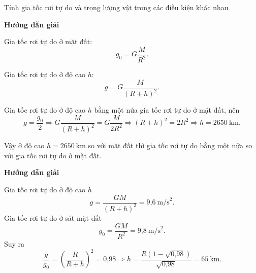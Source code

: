 \begin{dang}{Tính gia tốc rơi tự do và  trọng lượng vật trong các điều kiện khác nhau}
	{	\begin{center}
			\textbf{Hướng dẫn giải}
		\end{center}
		
		Gia tốc rơi tự do ở mặt đất:
		$$g_0 = G \dfrac {M}{R^2}.$$
		
		Gia tốc rơi tự do ở độ cao $h$:
		$$g=G \dfrac {M}{(R+h)^2}.$$
		
		Gia tốc rơi tự do ở độ cao $h$ bằng một nửa gia tốc rơi tự do ở mặt đất, nên
		$$g=\dfrac{g_0}{2} \Rightarrow G \dfrac {M}{(R+h)^2} = G \dfrac {M}{2R^2} \Rightarrow (R+h)^2 = 2 R^2 \Rightarrow h=\SI{2650}{\kilo \meter}.$$
		
		Vậy ở độ cao $h=\SI{2650}{\kilo \meter}$ so với mặt đất thì gia tốc rơi tự do bằng một nửa so với gia tốc rơi tự do ở mặt đất.
		
	}
	{	\begin{center}
			\textbf{Hướng dẫn giải}
		\end{center}
		
		Gia tốc rơi tự do ở độ cao $h$ 
		\begin{equation*}
			g = \dfrac{GM}{(R+h)^2} = \text{9,6}\ \text{m/s}^2.
		\end{equation*}
		Gia tốc rơi tự do ở sát mặt đất 
		\begin{equation*}
			g_0 = \dfrac{GM}{R^2} = \text{9,8}\ \text{m/s}^2.
		\end{equation*}
		Suy ra 
		\begin{equation*}
			\dfrac{g}{g_0}= \left(\dfrac{R}{R+h}\right)^2 =\text{0,98}\Rightarrow h = \dfrac{R(1- \sqrt{\text{0,98}})}{\sqrt {\text{0,98}}} = 65\ \text{km}.
		\end{equation*}
		
	}
\end{dang}
